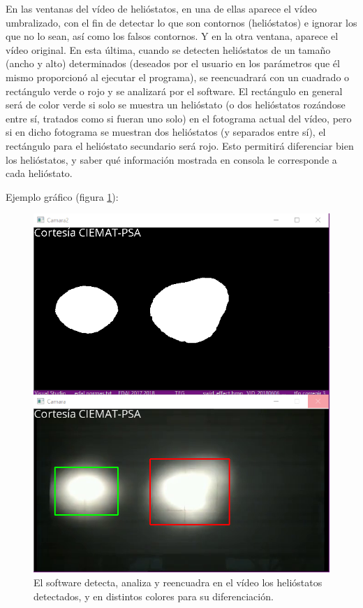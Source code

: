 En las ventanas del vídeo de helióstatos, en una de ellas aparece el vídeo umbralizado, con el fin de detectar lo que son contornos (helióstatos) e ignorar los que no lo sean, así como los falsos contornos. Y en la otra ventana, aparece el vídeo original. En esta última, cuando se detecten helióstatos de un tamaño (ancho y alto) determinados (deseados por el usuario en los parámetros que él mismo proporcionó al ejecutar el programa), se reencuadrará con un cuadrado o rectángulo verde o rojo y se analizará por el software. El rectángulo en general será de color verde si solo se muestra un helióstato (o dos helióstatos rozándose entre sí, tratados como si fueran uno solo) en el fotograma actual del vídeo, pero si en dicho fotograma se muestran dos helióstatos (y separados entre sí), el rectángulo para el helióstato secundario será rojo. Esto permitirá diferenciar bien los helióstatos, y saber qué información mostrada en consola le corresponde a cada helióstato.

Ejemplo gráfico (figura \ref{fig:CapturasEntradasYSalidas/unnamed(1).png}):

\begin{figure}[h!]
  	\centering
	\includegraphics[width=\textwidth]{CapturasEntradasYSalidas/unnamed(1).png}
	\caption{El software detecta, analiza y reencuadra en el vídeo los helióstatos detectados, y en distintos colores para su diferenciación.
	\label{fig:CapturasEntradasYSalidas/unnamed(1).png}}
\end{figure}


